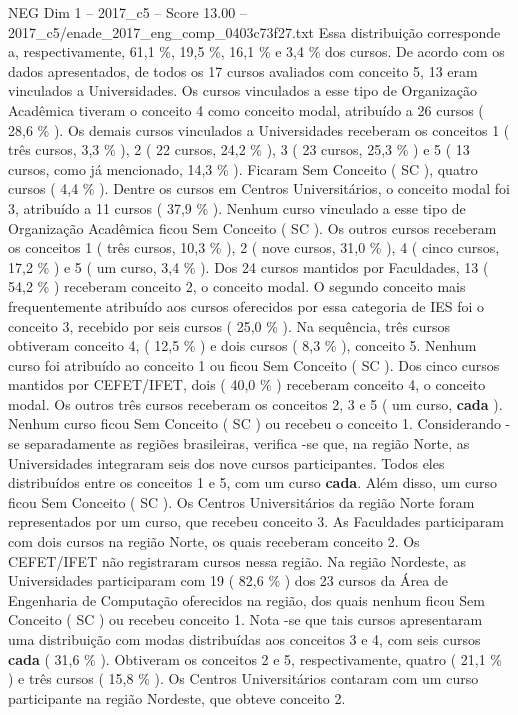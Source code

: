 \begin{textsample}{NEG Dim 1 – 2017\_c5 – Score 13.00 – 2017\_c5/enade\_2017\_eng\_comp\_0403c73f27.txt}
Essa distribuição corresponde a, respectivamente, 61,1 \%, 19,5 \%, 16,1 \% e 3,4 \% dos cursos.
De acordo com os dados apresentados, de todos os 17 cursos avaliados com conceito 5, 13 eram vinculados a Universidades.
Os cursos vinculados a esse tipo de Organização Acadêmica tiveram o conceito 4 como conceito modal, atribuído a 26 cursos ( 28,6 \% ).
Os demais cursos vinculados a Universidades receberam os conceitos 1 ( três cursos, 3,3 \% ), 2 ( 22 cursos, 24,2 \% ), 3 ( 23 cursos, 25,3 \% ) e 5 ( 13 cursos, como já mencionado, 14,3 \% ).
Ficaram Sem Conceito ( SC ), quatro cursos ( 4,4 \% ).
Dentre os cursos em Centros Universitários, o conceito modal foi 3, atribuído a 11 cursos ( 37,9 \% ).
Nenhum curso vinculado a esse tipo de Organização Acadêmica ficou Sem Conceito ( SC ).
Os outros cursos receberam os conceitos 1 ( três cursos, 10,3 \% ), 2 ( nove cursos, 31,0 \% ), 4 ( cinco cursos, 17,2 \% ) e 5 ( um curso, 3,4 \% ).
Dos 24 cursos mantidos por Faculdades, 13 ( 54,2 \% ) receberam conceito 2, o conceito modal.
O segundo conceito mais frequentemente atribuído aos cursos oferecidos por essa categoria de IES foi o conceito 3, recebido por seis cursos ( 25,0 \% ).
Na sequência, três cursos obtiveram conceito 4, ( 12,5 \% ) e dois cursos ( 8,3 \% ), conceito 5.
Nenhum curso foi atribuído ao conceito 1 ou ficou Sem Conceito ( SC ).
Dos cinco cursos mantidos por CEFET/IFET, dois ( 40,0 \% ) receberam conceito 4, o conceito modal.
Os outros três cursos receberam os conceitos 2, 3 e 5 ( um curso, \textbf{cada} ).
Nenhum curso ficou Sem Conceito ( SC ) ou recebeu o conceito 1.
Considerando -se separadamente as regiões brasileiras, verifica -se que, na região Norte, as Universidades integraram seis dos nove cursos participantes.
Todos eles distribuídos entre os conceitos 1 e 5, com um curso \textbf{cada}.
Além disso, um curso ficou Sem Conceito ( SC ).
Os Centros Universitários da região Norte foram representados por um curso, que recebeu conceito 3.
As Faculdades participaram com dois cursos na região Norte, os quais receberam conceito 2.
Os CEFET/IFET não registraram cursos nessa região.
Na região Nordeste, as Universidades participaram com 19 ( 82,6 \% ) dos 23 cursos da Área de Engenharia de Computação oferecidos na região, dos quais nenhum ficou Sem Conceito ( SC ) ou recebeu conceito 1.
Nota -se que tais cursos apresentaram uma distribuição com modas distribuídas aos conceitos 3 e 4, com seis cursos \textbf{cada} ( 31,6 \% ).
Obtiveram os conceitos 2 e 5, respectivamente, quatro ( 21,1 \% ) e três cursos ( 15,8 \% ).
Os Centros Universitários contaram com um curso participante na região Nordeste, que obteve conceito 2.

\end{textsample}
